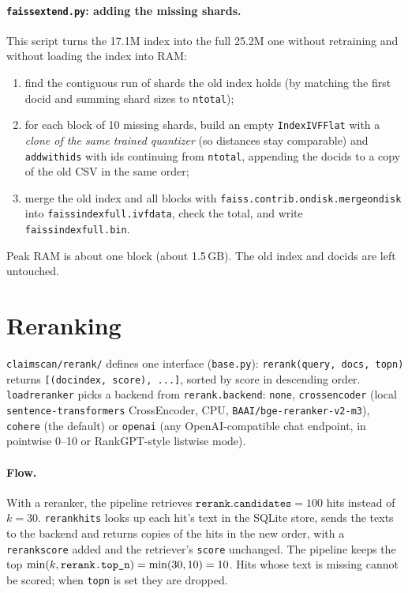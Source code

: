 \documentclass[11pt,a4paper]{article}
\makeatletter
\DeclareRobustCommand{\_}{\ifmmode\nfss@text{\textunderscore}\else\textunderscore\allowbreak\fi}
\newcommand{\file}[1]{\texttt{#1}}
\makeatother
\begin{document}
\paragraph{\file{faiss\_extend.py}: adding the missing shards.} This script turns the 17.1M index into the full
25.2M one without retraining and without loading the index into RAM:
\begin{enumerate}
  \item find the contiguous run of shards the old index holds (by matching the first docid and summing shard sizes
        to \texttt{ntotal});
  \item for each block of 10 missing shards, build an empty \texttt{IndexIVFFlat} with a \emph{clone of the same
        trained quantizer} (so distances stay comparable) and \texttt{add\_with\_ids} with ids continuing from
        \texttt{ntotal}, appending the docids to a copy of the old CSV in the same order;
  \item merge the old index and all blocks with \texttt{faiss.contrib.ondisk.merge\_ondisk} into
        \file{faiss\_index\_full.ivfdata}, check the total, and write \file{faiss\_index\_full.bin}.
\end{enumerate}
Peak RAM is about one block (about 1.5\,GB). The old index and docids are left untouched.

\section{Reranking}

\file{claimscan/rerank/} defines one interface (\file{base.py}):
\texttt{rerank(query, docs, top\_n)} returns \texttt{[(doc\_index, score), ...]}, sorted by score in descending
order. \texttt{load\_reranker} picks a backend from \texttt{rerank.backend}: \texttt{none}, \texttt{cross\_encoder}
(local \texttt{sentence-transformers} CrossEncoder, CPU, \texttt{BAAI/bge-reranker-v2-m3}), \texttt{cohere}
(the default) or \texttt{openai} (any OpenAI-compatible chat endpoint, in pointwise 0--10 or RankGPT-style listwise
mode).

\paragraph{Flow.} With a reranker, the pipeline retrieves $\texttt{rerank.candidates}=100$ hits instead of $k=30$.
\texttt{rerank\_hits} looks up each hit's text in the SQLite store, sends the texts to the backend and returns copies
of the hits in the new order, with a \texttt{rerank\_score} added and the retriever's \texttt{score} unchanged.
The pipeline keeps the top $\min(k, \texttt{rerank.top\_n}) = \min(30, 10) = 10$. Hits whose text is missing cannot
be scored; when \texttt{top\_n} is set they are dropped.
\end{document}
